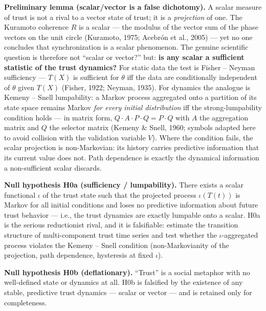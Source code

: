 \documentclass[11pt,twocolumn]{article}
\theoremstyle{gttdef}
\theoremstyle{gttplain}
\begin{document}
\textbf{Preliminary lemma (scalar/vector is a false dichotomy).} A scalar measure of trust is not a rival to a vector state of trust; it is a \emph{projection} of one. The Kuramoto coherence $R$ is a scalar --- the modulus of the vector sum of the phase vectors on the unit circle (Kuramoto, 1975; Acebr\'on et al., 2005) --- yet no one concludes that synchronization is a scalar phenomenon. The genuine scientific question is therefore not ``scalar or vector?'' but: \textbf{is any scalar a sufficient statistic of the trust dynamics?} For static data the test is Fisher -- Neyman sufficiency --- $T(X)$ is sufficient for $\theta$ iff the data are conditionally independent of $\theta$ given $T(X)$ (Fisher, 1922; Neyman, 1935). For dynamics the analogue is Kemeny -- Snell lumpability: a Markov process aggregated onto a partition of its state space remains Markov \emph{for every initial distribution} iff the strong-lumpability condition holds --- in matrix form, $Q \cdot A \cdot P \cdot Q = P \cdot Q$ with $A$ the aggregation matrix and $Q$ the selector matrix (Kemeny \& Snell, 1960; symbols adapted here to avoid collision with the validation variable $V$). Where the condition fails, the scalar projection is non-Markovian: its history carries predictive information that its current value does not. Path dependence is exactly the dynamical information a non-sufficient scalar discards.

\textbf{Null hypothesis H0a (sufficiency / lumpability).} There exists a scalar functional $\iota$ of the trust state such that the projected process $\iota(T(t))$ is Markov for all initial conditions and loses no predictive information about future trust behavior --- i.e., the trust dynamics are exactly lumpable onto a scalar. H0a is the serious reductionist rival, and it is falsifiable: estimate the transition structure of multi-component trust time series and test whether the $\iota$-aggregated process violates the Kemeny -- Snell condition (non-Markovianity of the projection, path dependence, hysteresis at fixed $\iota$).

\textbf{Null hypothesis H0b (deflationary).} ``Trust'' is a social metaphor with no well-defined state or dynamics at all. H0b is falsified by the existence of any stable, predictive trust dynamics --- scalar or vector --- and is retained only for completeness.
\end{document}
